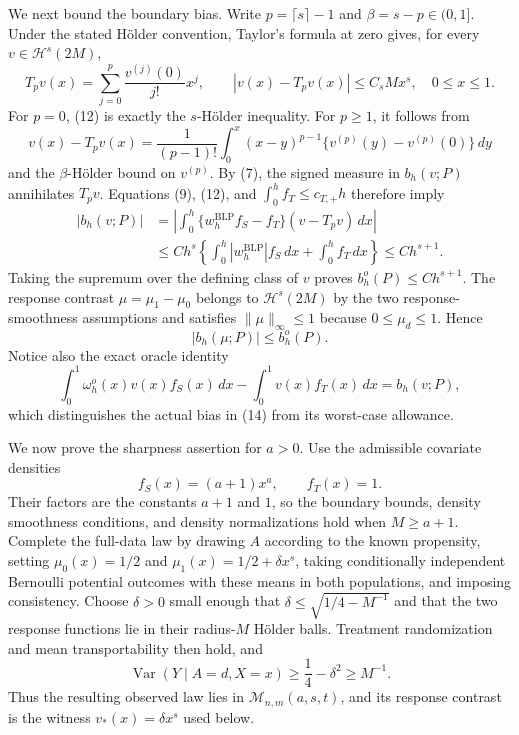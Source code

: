 We next bound the boundary bias. Write \(p=\lceil s\rceil-1\) and \(\beta=s-p\in(0,1]\). Under the stated Hölder convention, Taylor's formula at zero gives, for every \(v\in\mathcal H^s(2M)\),
\[
T_pv(x)=\sum_{j=0}^p\frac{v^{(j)}(0)}{j!}x^j,
\qquad
|v(x)-T_pv(x)|\le C_sM x^s,
\quad 0\le x\le1.
\tag{12}
\]
For \(p=0\), (12) is exactly the \(s\)-Hölder inequality. For \(p\ge1\), it follows from
\[
v(x)-T_pv(x)
=\frac1{(p-1)!}\int_0^x(x-y)^{p-1}
\{v^{(p)}(y)-v^{(p)}(0)\}\,dy
\]
and the \(\beta\)-Hölder bound on \(v^{(p)}\). By (7), the signed measure in \(b_h(v;P)\) annihilates \(T_pv\). Equations (9), (12), and \(\int_0^hf_T\le c_{T,+}h\) therefore imply
\[
\begin{aligned}
|b_h(v;P)|
&=\left|\int_0^h\{w_h^{\mathrm{BLP}}f_S-f_T\}(v-T_pv)\,dx\right|\\
&\le C h^s
\left\{\int_0^h|w_h^{\mathrm{BLP}}|f_S\,dx+
\int_0^hf_T\,dx\right\}
\le Ch^{s+1}.
\end{aligned}
\tag{13}
\]
Taking the supremum over the defining class of \(v\) proves \(b_h^o(P)\le Ch^{s+1}\). The response contrast \(\mu=\mu_1-\mu_0\) belongs to \(\mathcal H^s(2M)\) by the two response-smoothness assumptions and satisfies \(\|\mu\|_\infty\le1\) because \(0\le\mu_d\le1\). Hence
\[
|b_h(\mu;P)|\le b_h^o(P).
\tag{14}
\]
Notice also the exact oracle identity
\[
\int_0^1\omega_h^o(x)v(x)f_S(x)\,dx-
\int_0^1v(x)f_T(x)\,dx=b_h(v;P),
\tag{15}
\]
which distinguishes the actual bias in (14) from its worst-case allowance.

We now prove the sharpness assertion for \(a>0\). Use the admissible covariate densities
\[
f_S(x)=(a+1)x^a,
\qquad f_T(x)=1.
\tag{16}
\]
Their factors are the constants \(a+1\) and \(1\), so the boundary bounds, density smoothness conditions, and density normalizations hold when \(M\ge a+1\). Complete the full-data law by drawing \(A\) according to the known propensity, setting \(\mu_0(x)=1/2\) and \(\mu_1(x)=1/2+\delta x^s\), taking conditionally independent Bernoulli potential outcomes with these means in both populations, and imposing consistency. Choose \(\delta>0\) small enough that \(\delta\le\sqrt{1/4-M^{-1}}\) and that the two response functions lie in their radius-\(M\) Hölder balls. Treatment randomization and mean transportability then hold, and
\[
\operatorname{Var}(Y\mid A=d,X=x)\ge\frac14-\delta^2\ge M^{-1}.
\]
Thus the resulting observed law lies in \(\mathcal M_{n,m}(a,s,t)\), and its response contrast is the witness \(v_*(x)=\delta x^s\) used below.

